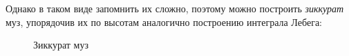 Однако в таком виде запомнить их сложно, поэтому можно построить \textit{зиккурат} муз, упорядочив их по высотам аналогично построению интеграла Лебега:

\begin{figure}[ht]
    \centering
    \caption{Зиккурат муз}
\end{figure}

